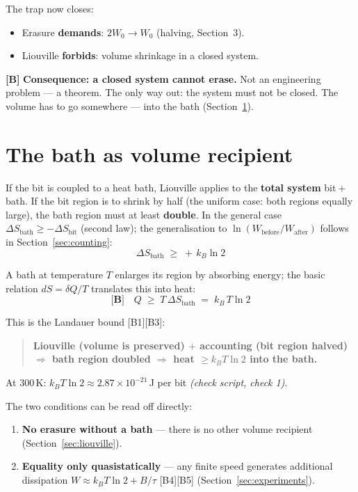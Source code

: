 The trap now closes:
\begin{itemize}[leftmargin=1.4em,itemsep=0.2em]
  \item Erasure \textbf{demands}: $2W_0 \to W_0$ (halving, Section~3).
  \item Liouville \textbf{forbids}: volume shrinkage in a closed system.
\end{itemize}

\textbf{[B]} \textbf{Consequence: a closed system cannot erase.} Not an engineering problem
--- a theorem. The only way out: the system must not be closed. The volume has to
go somewhere --- into the bath (Section~\ref{sec:bath}).

\section{The bath as volume recipient}
\label{sec:bath}

If the bit is coupled to a heat bath, Liouville applies to the \textbf{total
system} bit${}+{}$bath. If the bit region is to shrink by half (the uniform case:
both regions equally large), the bath region must at least \textbf{double}. In the
general case $\Delta S_{\text{bath}} \ge -\Delta S_{\text{bit}}$ (second law); the
generalisation to $\ln(W_{\text{before}}/W_{\text{after}})$ follows in
Section~\ref{sec:counting}:
\[
  \Delta S_{\text{bath}} \;\ge\; +\,k_B \ln 2
\]

A bath at temperature $T$ enlarges its region by absorbing energy; the basic
relation $dS = \delta Q/T$ translates this into heat:
\[
  \textbf{[B]}\quad Q \;\ge\; T\,\Delta S_{\text{bath}} \;=\; k_B\,T \ln 2
\]

This is the Landauer bound [B1][B3]:

\begin{quote}
\textbf{Liouville (volume is preserved) $+$ accounting (bit region halved)
$\Rightarrow$ bath region doubled $\Rightarrow$ heat $\ge k_B T \ln 2$ into the
bath.}
\end{quote}

At 300\,K: $k_B T \ln 2 \approx 2.87\times10^{-21}$\,J per bit
\emph{(check script, check 1)}.

The two conditions can be read off directly:
\begin{enumerate}[leftmargin=1.6em,itemsep=0.2em]
  \item \textbf{No erasure without a bath} --- there is no other volume recipient
        (Section~\ref{sec:liouville}).
  \item \textbf{Equality only quasistatically} --- any finite speed generates
        additional dissipation $W \approx k_B T \ln 2 + B/\tau$ [B4][B5]
        (Section~\ref{sec:experiments}).
\end{enumerate}

